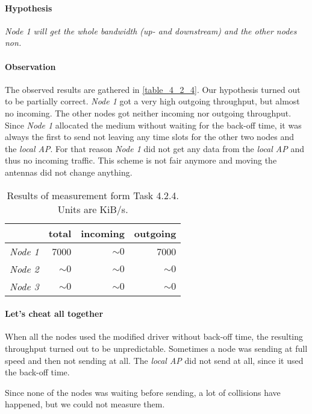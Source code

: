 \documentclass[12pt,a4paper]{article}
\begin{document}
\paragraph{Hypothesis}
\emph{Node 1 will get the whole bandwidth (up- and downstream) and the other nodes non.}

\paragraph{Observation}
The observed results are gathered in \autoref{table_4_2_4}.
Our hypothesis turned out to be partially correct.
\emph{Node 1} got a very high outgoing throughput, but almost no incoming.
The other nodes got neither incoming nor outgoing throughput.
Since \emph{Node 1} allocated the medium without waiting for the back-off time, it was always the first to send not leaving any time slots for the other two nodes and the \emph{local AP}. For that reason \emph{Node 1} did not get any data from the \emph{local AP} and thus no incoming traffic.
This scheme is not fair anymore and moving the antennas did not change anything.

\begin{table}
	\begin{center}
		\begin{tabular}{r|r|r|r}\
		 & total & incoming & outgoing \\
		 \hline 
		 \emph{Node 1} & 7000 & $\sim0$ & 7000 \\
		 \emph{Node 2} & $\sim0$ & $\sim0$ & $\sim0$ \\
		 \emph{Node 3} & $\sim0$ & $\sim0$ & $\sim0$ \\
		\end{tabular}
		
		\caption{Results of measurement form Task 4.2.4. Units are KiB/s.}
		\label{table_4_2_4}
	\end{center}
	\end{table}

\paragraph{Let's cheat all together}
When all the nodes used the modified driver without back-off time, the resulting throughput turned out to be unpredictable. Sometimes a node was sending at full speed and then not sending at all. The \emph{local AP} did not send at all, since it used the back-off time.

Since none of the nodes was waiting before sending, a lot of collisions have happened, but we could not measure them.
\end{document}
